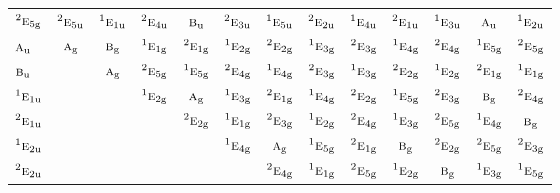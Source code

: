 \documentclass[10pt,a4paper]{article}
\numberwithin{equation}{section}
\newcommand{\irr}[1]{\text{\normalfont\scshape #1}}
\newcommand{\conjpair}[1]{{}^{#1}}
\newcommand{\ptag}[1]{\mathrm{#1}}
\begin{document}
{\begin{longtable}{@{}lcccccccccccc@{}}
$\conjpair{2}\irr{e}_{5\ptag{g}}$ & $\conjpair{2}\irr{e}_{5\ptag{u}}$ & $\conjpair{1}\irr{e}_{1\ptag{u}}$ & $\conjpair{2}\irr{e}_{4\ptag{u}}$ & $\irr{b}_{\ptag{u}}$ & $\conjpair{2}\irr{e}_{3\ptag{u}}$ & $\conjpair{1}\irr{e}_{5\ptag{u}}$ & $\conjpair{2}\irr{e}_{2\ptag{u}}$ & $\conjpair{1}\irr{e}_{4\ptag{u}}$ & $\conjpair{2}\irr{e}_{1\ptag{u}}$ & $\conjpair{1}\irr{e}_{3\ptag{u}}$ & $\irr{a}_{\ptag{u}}$ & $\conjpair{1}\irr{e}_{2\ptag{u}}$\\
$\irr{a}_{\ptag{u}}$ & $\irr{a}_{\ptag{g}}$ & $\irr{b}_{\ptag{g}}$ & $\conjpair{1}\irr{e}_{1\ptag{g}}$ & $\conjpair{2}\irr{e}_{1\ptag{g}}$ & $\conjpair{1}\irr{e}_{2\ptag{g}}$ & $\conjpair{2}\irr{e}_{2\ptag{g}}$ & $\conjpair{1}\irr{e}_{3\ptag{g}}$ & $\conjpair{2}\irr{e}_{3\ptag{g}}$ & $\conjpair{1}\irr{e}_{4\ptag{g}}$ & $\conjpair{2}\irr{e}_{4\ptag{g}}$ & $\conjpair{1}\irr{e}_{5\ptag{g}}$ & $\conjpair{2}\irr{e}_{5\ptag{g}}$\\
$\irr{b}_{\ptag{u}}$ &  & $\irr{a}_{\ptag{g}}$ & $\conjpair{2}\irr{e}_{5\ptag{g}}$ & $\conjpair{1}\irr{e}_{5\ptag{g}}$ & $\conjpair{2}\irr{e}_{4\ptag{g}}$ & $\conjpair{1}\irr{e}_{4\ptag{g}}$ & $\conjpair{2}\irr{e}_{3\ptag{g}}$ & $\conjpair{1}\irr{e}_{3\ptag{g}}$ & $\conjpair{2}\irr{e}_{2\ptag{g}}$ & $\conjpair{1}\irr{e}_{2\ptag{g}}$ & $\conjpair{2}\irr{e}_{1\ptag{g}}$ & $\conjpair{1}\irr{e}_{1\ptag{g}}$\\
$\conjpair{1}\irr{e}_{1\ptag{u}}$ &  &  & $\conjpair{1}\irr{e}_{2\ptag{g}}$ & $\irr{a}_{\ptag{g}}$ & $\conjpair{1}\irr{e}_{3\ptag{g}}$ & $\conjpair{2}\irr{e}_{1\ptag{g}}$ & $\conjpair{1}\irr{e}_{4\ptag{g}}$ & $\conjpair{2}\irr{e}_{2\ptag{g}}$ & $\conjpair{1}\irr{e}_{5\ptag{g}}$ & $\conjpair{2}\irr{e}_{3\ptag{g}}$ & $\irr{b}_{\ptag{g}}$ & $\conjpair{2}\irr{e}_{4\ptag{g}}$\\
$\conjpair{2}\irr{e}_{1\ptag{u}}$ &  &  &  & $\conjpair{2}\irr{e}_{2\ptag{g}}$ & $\conjpair{1}\irr{e}_{1\ptag{g}}$ & $\conjpair{2}\irr{e}_{3\ptag{g}}$ & $\conjpair{1}\irr{e}_{2\ptag{g}}$ & $\conjpair{2}\irr{e}_{4\ptag{g}}$ & $\conjpair{1}\irr{e}_{3\ptag{g}}$ & $\conjpair{2}\irr{e}_{5\ptag{g}}$ & $\conjpair{1}\irr{e}_{4\ptag{g}}$ & $\irr{b}_{\ptag{g}}$\\
$\conjpair{1}\irr{e}_{2\ptag{u}}$ &  &  &  &  & $\conjpair{1}\irr{e}_{4\ptag{g}}$ & $\irr{a}_{\ptag{g}}$ & $\conjpair{1}\irr{e}_{5\ptag{g}}$ & $\conjpair{2}\irr{e}_{1\ptag{g}}$ & $\irr{b}_{\ptag{g}}$ & $\conjpair{2}\irr{e}_{2\ptag{g}}$ & $\conjpair{2}\irr{e}_{5\ptag{g}}$ & $\conjpair{2}\irr{e}_{3\ptag{g}}$\\
$\conjpair{2}\irr{e}_{2\ptag{u}}$ &  &  &  &  &  & $\conjpair{2}\irr{e}_{4\ptag{g}}$ & $\conjpair{1}\irr{e}_{1\ptag{g}}$ & $\conjpair{2}\irr{e}_{5\ptag{g}}$ & $\conjpair{1}\irr{e}_{2\ptag{g}}$ & $\irr{b}_{\ptag{g}}$ & $\conjpair{1}\irr{e}_{3\ptag{g}}$ & $\conjpair{1}\irr{e}_{5\ptag{g}}$\\

\end{longtable}}
\end{document}
